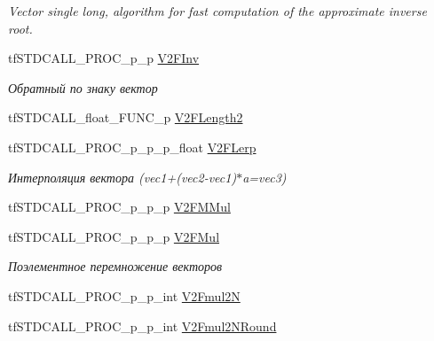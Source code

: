 \begin{DoxyCompactItemize}
\begin{DoxyCompactList}\small\item\em Vector single long, algorithm for fast computation of the approximate inverse root. \end{DoxyCompactList}\item 
\hypertarget{structs_functions_vector_c_p_u_a4a216040b7dc069759c6b39b7c30be94}{tf\-S\-T\-D\-C\-A\-L\-L\-\_\-\-P\-R\-O\-C\-\_\-p\-\_\-p \hyperlink{structs_functions_vector_c_p_u_a4a216040b7dc069759c6b39b7c30be94}{V2\-F\-Inv}}\label{structs_functions_vector_c_p_u_a4a216040b7dc069759c6b39b7c30be94}

\begin{DoxyCompactList}\small\item\em Обратный по знаку вектор \end{DoxyCompactList}\item 
tf\-S\-T\-D\-C\-A\-L\-L\-\_\-float\-\_\-\-F\-U\-N\-C\-\_\-p \hyperlink{structs_functions_vector_c_p_u_a1e0426413a1ab245b6ca575009d2729f}{V2\-F\-Length2}
\item 
\hypertarget{structs_functions_vector_c_p_u_a5ed9902a48b9cebb1a96bcd7ce6c2cf6}{tf\-S\-T\-D\-C\-A\-L\-L\-\_\-\-P\-R\-O\-C\-\_\-p\-\_\-p\-\_\-p\-\_\-float \hyperlink{structs_functions_vector_c_p_u_a5ed9902a48b9cebb1a96bcd7ce6c2cf6}{V2\-F\-Lerp}}\label{structs_functions_vector_c_p_u_a5ed9902a48b9cebb1a96bcd7ce6c2cf6}

\begin{DoxyCompactList}\small\item\em Интерполяция вектора (vec1+(vec2-\/vec1)$\ast$a=vec3) \end{DoxyCompactList}\item 
tf\-S\-T\-D\-C\-A\-L\-L\-\_\-\-P\-R\-O\-C\-\_\-p\-\_\-p\-\_\-p \hyperlink{structs_functions_vector_c_p_u_a2850d26ea78f1b9a046bcf66a5e1d3a9}{V2\-F\-M\-Mul}
\item 
\hypertarget{structs_functions_vector_c_p_u_acfd56c56fd4ccad6fd0845688b2cf841}{tf\-S\-T\-D\-C\-A\-L\-L\-\_\-\-P\-R\-O\-C\-\_\-p\-\_\-p\-\_\-p \hyperlink{structs_functions_vector_c_p_u_acfd56c56fd4ccad6fd0845688b2cf841}{V2\-F\-Mul}}\label{structs_functions_vector_c_p_u_acfd56c56fd4ccad6fd0845688b2cf841}

\begin{DoxyCompactList}\small\item\em Поэлементное перемножение векторов \end{DoxyCompactList}\item 
tf\-S\-T\-D\-C\-A\-L\-L\-\_\-\-P\-R\-O\-C\-\_\-p\-\_\-p\-\_\-int \hyperlink{structs_functions_vector_c_p_u_ada60262a7110c5dfbc5a36d38297835b}{V2\-Fmul2\-N}
\item 
\hypertarget{structs_functions_vector_c_p_u_a0ec9aa13bd28f63d11787807dc12f2b2}{tf\-S\-T\-D\-C\-A\-L\-L\-\_\-\-P\-R\-O\-C\-\_\-p\-\_\-p\-\_\-int \hyperlink{structs_functions_vector_c_p_u_a0ec9aa13bd28f63d11787807dc12f2b2}{V2\-Fmul2\-N\-Round}}\label{structs_functions_vector_c_p_u_a0ec9aa13bd28f63d11787807dc12f2b2}


\end{DoxyCompactItemize}
